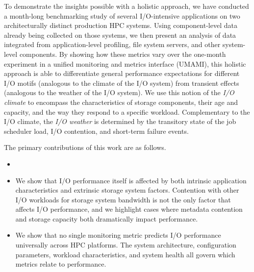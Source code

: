 To demonstrate the insights possible with a holistic approach, we have conducted a month-long benchmarking study of several I/O-intensive applications on two architecturally distinct production HPC systems.
Using component-level data already being collected on those systems, we then present an analysis of data integrated from application-level profiling, file system servers, and other system-level components.
By showing how these metrics vary over the one-month experiment in a unified monitoring and metrics interface (UMAMI), this holistic approach is able to differentiate general performance expectations for different I/O motifs (analogous to the climate of the I/O system) from transient effects (analogous to the weather of the I/O system).
We use this notion of the \emph{I/O climate} to encompass the characteristics of storage components, their age and capacity, and the way they respond to a specific workload.
Complementary to the I/O climate, the \emph{I/O weather} is determined by the transitory state of the job scheduler load, I/O contention, and short-term failure events.

The primary contributions of this work are as follows.

\begin{itemize}[leftmargin=*]

\item {}

\item We show that I/O performance itself is affected by both intrinsic application characteristics and extrinsic storage system factors.
Contention with other I/O workloads for storage system bandwidth is not the only factor that affects I/O performance, and
we highlight cases where metadata contention and storage capacity both dramatically impact performance.

\item We show that no single monitoring metric predicts I/O performance universally across HPC platforms.
The system architecture, configuration parameters, workload characteristics, and system health all govern which metrics relate to performance.

\end{itemize}

